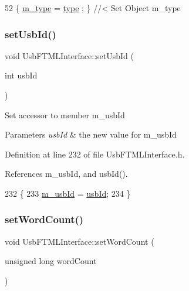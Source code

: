 \begin{DoxyCode}
52 \{ \hyperlink{classObject_a457a600fe8c00eb1034374f75110a78c}{m\_type}  = \hyperlink{classObject_a84f99f70f144a83e1582d1d0f84e4e62}{type}  ; \} \textcolor{comment}{//< Set Object m\_type}
\end{DoxyCode}
\mbox{\label{classUsbFTMLInterface_a00dc58835d65f98593e15287c1c8c6ab}} 
\subsubsection{\texorpdfstring{set\+Usb\+Id()}{setUsbId()}}
{\footnotesize\ttfamily void Usb\+F\+T\+M\+L\+Interface\+::set\+Usb\+Id (\begin{DoxyParamCaption}\item[{int}]{usb\+Id }\end{DoxyParamCaption})\hspace{0.3cm}{\ttfamily [inline]}}

Set accessor to member m\+\_\+usb\+Id 
\begin{DoxyParams}{Parameters}
{\em usb\+Id} & the new value for m\+\_\+usb\+Id \\
\hline
\end{DoxyParams}


Definition at line 232 of file Usb\+F\+T\+M\+L\+Interface.\+h.



References m\+\_\+usb\+Id, and usb\+Id().


\begin{DoxyCode}
232                             \{
233     \hyperlink{classUsbFTMLInterface_aab6754587c303660d5c498ce34a2b4c8}{m\_usbId} = \hyperlink{classUsbFTMLInterface_a99016c7661780ed89195dc507d3516fc}{usbId};
234   \}
\end{DoxyCode}
\mbox{\label{classUsbFTMLInterface_a3061389b73d2c2be1d53007723f9280e}} 
\subsubsection{\texorpdfstring{set\+Word\+Count()}{setWordCount()}}
{\footnotesize\ttfamily void Usb\+F\+T\+M\+L\+Interface\+::set\+Word\+Count (\begin{DoxyParamCaption}\item[{unsigned long}]{word\+Count }\end{DoxyParamCaption})\hspace{0.3cm}{\ttfamily [inline]}}

